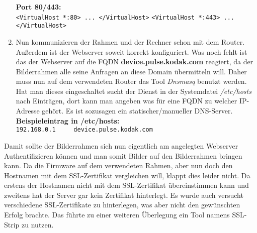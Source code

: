 \begin{flushleft}
\begin{enumerate}
      \vspace{.5cm}
      \textbf{Port 80/443:}\\
      \verb|<VirtualHost *:80> ... </VirtualHost>|
      \verb|<VirtualHost *:443> ... </VirtualHost>|
      \item Nun kommunizieren der Rahmen und der Rechner schon mit dem Router. Außerdem ist der Webserver soweit korrekt konfiguriert. Was noch fehlt ist das der Webserver auf die FQDN \textbf{device.pulse.kodak.com} reagiert, da der Bilderrahmen alle seine Anfragen an diese Domain übermitteln will. Daher muss nun auf dem verwendeten Router das Tool \textit{Dnsmasq} benutzt werden. Hat man dieses eingeschaltet sucht der Dienst in der Systemdatei \textit{/etc/hosts} nach Einträgen, dort kann man angeben was für eine FQDN zu welcher IP-Adresse gehört. Es ist sozusagen ein statischer/manueller DNS-Server.\\\vspace{.3cm}
      \textbf{Beispieleintrag in /etc/hosts:}\\
      \verb|192.168.0.1 	device.pulse.kodak.com|
    \end{enumerate}
    Damit sollte der Bilderrahmen sich nun eigentlich am angelegten Webserver Authentifizieren können und man somit Bilder auf den Bilderrahmen bringen kann. Da die Firmware auf dem verwendeten Rahmen, aber nun doch den Hostnamen mit dem SSL-Zertifikat vergleichen will, klappt dies leider nicht. Da erstens der Hostnamen nicht mit dem SSL-Zertifikat übereinstimmen kann und zweitens hat der Server gar kein Zertifikat hinterlegt. Es wurde auch versucht verschiedene SSL-Zertifikate zu hinterlegen, was aber nicht den gewünschten Erfolg brachte. Das führte zu einer weiteren Überlegung ein Tool namens SSL-Strip zu nutzen.

\end{flushleft}
